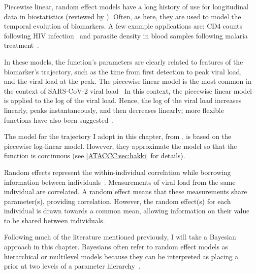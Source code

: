\documentclass[thesis.tex]{subfiles}
\begin{document}
Piecewise linear, random effect models have a long history of use for longitudinal data in biostatistics (reviewed by \textcite{slateStatistical}).
Often, as here, they are used to model the temporal evolution of biomarkers.
A few example applications are: CD4 counts following HIV infection~\autocite{langeHierarchical,lynchPredicting} and parasite density in blood samples following malaria treatment~\autocite{fogartyBayesian}.

In these models, the function's parameters are clearly related to features of the biomarker's trajectory, such as the time from first detection to peak viral load, and the viral load at the peak.
The piecewise linear model is the most common in the context of SARS-CoV-2 viral load~\autocite[e.g.][]{clearyUsing,kisslerViral,larremoreTest}
In this context, the piecewise linear model is applied to the log of the viral load.
Hence, the log of the viral load increases linearly, peaks instantaneously, and then decreases linearly; more flexible functions have also been suggested~\autocite{quiltyQuarantine}.

The model for the trajectory I adopt in this chapter, from \textcite{hakkiOnset}, is based on the piecewise log-linear model.
However, they approximate the model so that the function is continuous (see \cref{ATACCC:sec:hakki} for details).

Random effects represent the within-individual correlation while borrowing information between individuals~\autocite[chapter 24]{lashModern}.
Measurements of viral load from the same individual are correlated.
A random effect means that these measurements share parameter(s), providing correlation.
However, the random effect(s) for each individual is drawn towards a common mean, allowing information on their value to be shared between individuals.

Following much of the literature mentioned previously, I will take a Bayesian approach in this chapter.
Bayesians often refer to random effect models as hierarchical or multilevel models because they can be interpreted as placing a prior at two levels of a parameter hierarchy~\autocite[chapter 5]{gelmanBDA}.
\end{document}
